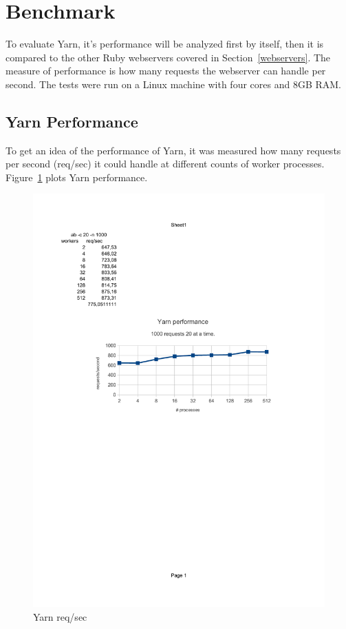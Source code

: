 \section{Benchmark}
\label{eval}
To evaluate Yarn, it's performance will be analyzed first by itself, then it
is compared to the other Ruby webservers covered in Section~\ref{webservers}.
The measure of performance is how many requests the webserver can handle per
second. The tests were run on a Linux machine with four cores and 8GB RAM.

\subsection{Yarn Performance}
To get an idea of the performance of Yarn, it was measured how many requests
per second (req/sec) it could handle at different counts of worker processes.
Figure~\ref{optwork} plots Yarn performance.

\begin{figure}[htb]
  \centering
  \includegraphics[width=1.0\textwidth]{results/optimal_workers_crop.pdf}
  \caption{Yarn req/sec}
  \label{optwork}
\end{figure}

